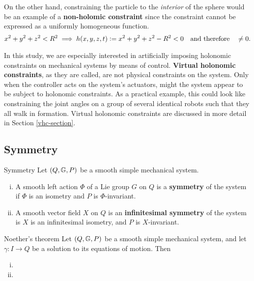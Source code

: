 \documentclass[main.tex]{subfiles}
\begin{document}
On the other hand, constraining the particle to the \textit{interior} of the sphere would be an example of a \textbf{non-holomic constraint} since the constraint cannot be expressed as a uniformly homogeneous function.
\begin{align}
    x^2+y^2+z^2<R^2 \implies h(x,y,z,t):=x^2+y^2+z^2-R^2<0\qq{and therefore}\neq 0.
\end{align}


In this study, we are especially interested in artificially imposing holonomic constraints on mechanical systems by means of control. \textbf{Virtual holonomic constraints}, as they are called, are not physical constraints on the system. Only when the controller acts on the system's actuators, might the system appear to be subject to holonomic constraints. As a practical example, this could look like constraining the joint angles on a group of several identical robots such that they all walk in formation\cite{maggiore2012virtual}. Virtual holonomic constraints are discussed in more detail in Section \ref{vhc-section}.


\subsection{Symmetry}
\begin{boxdef}{Symmetry \cite[291]{bullo2019geometric}%
}
Let $\del{Q,\mbbg,P}$ be a smooth simple mechanical system. \begin{enumerate}[i.]
    \item A smooth left action $\Phi$ of a Lie group $G$ on $Q$ is a \textbf{symmetry} of the system if $\Phi$ is an isometry and $P$ is $\Phi$-invariant.
    \item A smooth vector field $X$ on $Q$ is an \textbf{infinitesimal symmetry} of the system is $X$ is an infinitesimal isometry, and $P$ is $X$-invariant.
\end{enumerate}
\end{boxdef}

\begin{boxthm}{Noether's theorem\cite[292]{bullo2019geometric}%
}
Let $\del{Q,\mbbg,P}$ be a smooth simple mechanical system, and let $\gamma:I\to Q$ be a solution to its equations of motion. Then
\begin{enumerate}[i.]
    \item 
    \item 
\end{enumerate}
\end{boxthm}
\end{document}
